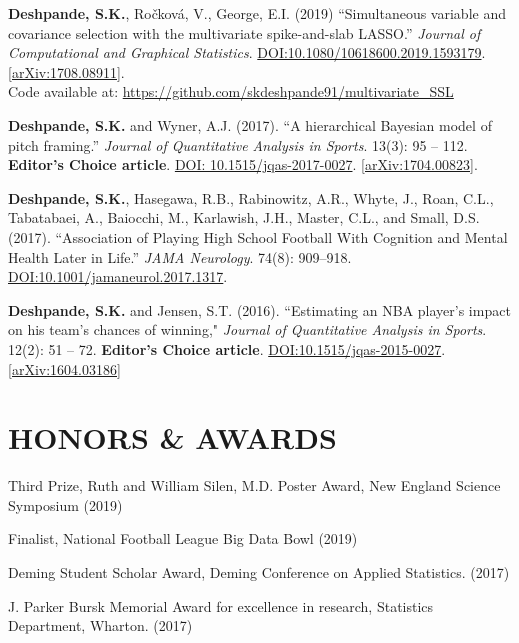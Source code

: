 \documentclass[margin]{res}
\begin{document}
\begin{resume}
\textbf{Deshpande, S.K.}, Ro\v{c}kov\'{a}, V.,  George, E.I. (2019) ``Simultaneous variable and covariance selection with the multivariate spike-and-slab LASSO.'' \textit{Journal of Computational and Graphical Statistics}. \href{https://doi.org/10.1080/10618600.2019.1593179}{DOI:10.1080/10618600.2019.1593179}. \href{https://arxiv.org/abs/1708.08911}{[arXiv:1708.08911]}. \\ Code available at: \url{https://github.com/skdeshpande91/multivariate_SSL}

\textbf{Deshpande, S.K.} and Wyner, A.J. (2017). ``A hierarchical Bayesian model of pitch framing.'' \textit{Journal of Quantitative Analysis in Sports}. 13(3): 95 -- 112. \textbf{Editor's Choice article}. \href{https://doi.org/10.1515/jqas-2017-0027}{DOI: 10.1515/jqas-2017-0027}. \href{https://arxiv.org/abs/1704.00823}{[arXiv:1704.00823]}.

\textbf{Deshpande, S.K.}, Hasegawa, R.B., Rabinowitz, A.R., Whyte, J., Roan, C.L., Tabatabaei, A., Baiocchi, M., Karlawish, J.H., Master, C.L., and Small, D.S. (2017). ``Association of Playing High School Football With Cognition and Mental Health Later in Life.'' \textit{JAMA Neurology}. 74(8): 909--918. \href{https://doi.org/10.1001/jamaneurol.2017.1317}{DOI:10.1001/jamaneurol.2017.1317}.

\textbf{Deshpande, S.K.} and Jensen, S.T. (2016). ``Estimating an NBA player's impact on his team's chances of winning," \textit{Journal of Quantitative Analysis in Sports}. 12(2): 51 -- 72. \textbf{Editor's Choice article}. \href{https://doi.org/10.1515/jqas-2015-0027}{DOI:10.1515/jqas-2015-0027}.\href{https://arxiv.org/abs/1604.03186}{[arXiv:1604.03186]}


\section{HONORS \& AWARDS} 

Third Prize, Ruth and William Silen, M.D. Poster Award, New England Science Symposium (2019)

Finalist, National Football League Big Data Bowl (2019)

Deming Student Scholar Award, Deming Conference on Applied Statistics. (2017)

J. Parker Bursk Memorial Award for excellence in research, Statistics Department, Wharton. (2017)


\end{resume}
\end{document}
